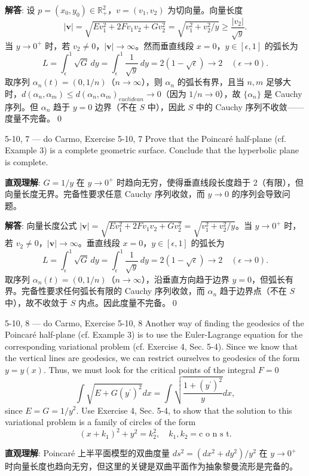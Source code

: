 \begin{Remark}
\begin{solution}
\textbf{解答}: 设 $p=(x_0,y_0)\in\mathbb{R}_+^2$，$v=(v_1,v_2)$ 为切向量。向量长度
\[
|\mathbf{v}|=\sqrt{E v_1^2+2F v_1v_2+G v_2^2}=\sqrt{v_1^2+v_2^2/y}\geq\frac{|v_2|}{\sqrt{y}}.
\]
当 $y\to 0^+$ 时，若 $v_2\neq 0$，$|\mathbf{v}|\to\infty$。然而垂直线段 $x=0$，$y\in[\epsilon,1]$ 的弧长为
\[
L=\int_\epsilon^1\sqrt{G}\,dy=\int_\epsilon^1\frac{1}{\sqrt{y}}\,dy=2(1-\sqrt{\epsilon})\to 2\quad(\epsilon\to 0).
\]
取序列 $\alpha_n(t)=(0,1/n)$（$n\to\infty$），则 $\alpha_n$ 的弧长有界，且当 $n,m$ 足够大时，$d(\alpha_n,\alpha_m)\leq d(\alpha_n,\alpha_m)_{euclidean}\to 0$（因为 $1/n\to 0$），故 $\{\alpha_n\}$ 是 Cauchy 序列。但 $\alpha_n$ 趋于 $y=0$ 边界（不在 $S$ 中），因此 $S$ 中的 Cauchy 序列不收敛——度量不完备。\qed
\end{solution}

\begin{exercise}{5-10, 7 — do Carmo, Exercise 5-10, 7}
Prove that the Poincaré half-plane (cf. Example 3) is a complete geometric surface. Conclude that the hyperbolic plane is complete.
\end{exercise}
\begin{solution}
\textbf{直观理解}: $G=1/y$ 在 $y\to 0^+$ 时趋向无穷，使得垂直线段长度趋于 2（有限），但向量长度无界。完备性要求任意 Cauchy 序列收敛，而 $y\to 0$ 的序列会导致问题。

\textbf{解答}: 向量长度公式 $|\mathbf{v}|=\sqrt{E v_1^2 + 2F v_1v_2 + G v_2^2}=\sqrt{v_1^2+v_2^2/y}$。当 $y\to 0^+$ 时，若 $v_2\neq 0$，$|\mathbf{v}|\to\infty$。垂直线段 $x=0$，$y\in[\epsilon,1]$ 的弧长为
\[
L=\int_\epsilon^1\sqrt{G}\,dy=\int_\epsilon^1\frac{1}{\sqrt{y}}\,dy=2(1-\sqrt{\epsilon})\to 2\quad(\epsilon\to 0).
\]
取序列 $\alpha_n(t)=(0,1/n)$（$n\to\infty$），沿垂直方向趋于边界 $y=0$，但弧长有界。完备性要求任何弧长有限的 Cauchy 序列收敛，而 $\alpha_n$ 趋于边界点（不在 $S$ 中），故不收敛于 $S$ 内点。因此度量不完备。\qed
\end{solution}

\begin{exercise}{5-10, 8 — do Carmo, Exercise 5-10, 8}
Another way of finding the geodesics of the Poincaré half-plane (cf. Example 3) is to use the Euler-Lagrange equation for the corresponding variational problem (cf. Exercise 4, Sec. 5-4). Since we know that the vertical lines are geodesics, we can restrict ourselves to geodesics of the form $y = y(x)$. Thus, we must look for the critical points of the integral $F = 0$
\[
\int \sqrt {E + G (y ^ {\prime}) ^ {2}} d x = \int \sqrt {\frac {1 + (y ^ {\prime}) ^ {2}}{y}} d x,
\]
since $E = G = 1 / y^2$. Use Exercise 4, Sec. 5-4, to show that the solution to this variational problem is a family of circles of the form
\[
(x + k _ {1}) ^ {2} + y ^ {2} = k _ {2} ^ {2}, \quad k _ {1}, k _ {2} = \text{c o n s t}.
\]
\end{exercise}
\begin{solution}
\textbf{直观理解}: Poincaré 上半平面模型的双曲度量 $ds^2=(dx^2+dy^2)/y^2$ 在 $y\to 0^+$ 时向量长度也趋向无穷，但这里的关键是双曲平面作为抽象黎曼流形是完备的。


\end{solution}
\end{Remark}
